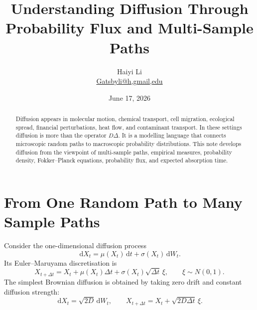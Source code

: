 \documentclass[11pt,a4paper]{article}
\title{\bfseries Understanding Diffusion Through Probability Flux and Multi-Sample Paths}
\author{Haiyi Li\\\href{mailto:Gatsbyli@h,gmail,edu}{Gatsbyli@h,gmail,edu}}
\date{June 17, 2026}
\numberwithin{equation}{section}
\newcommand{\dd}{\,\mathrm{d}}
\begin{document}
\maketitle

\begin{abstract}
Diffusion appears in molecular motion, chemical transport, cell migration, ecological spread, financial perturbations, heat flow, and contaminant transport. In these settings diffusion is more than the operator \(D\Delta\). It is a modelling language that connects microscopic random paths to macroscopic probability distributions. This note develops diffusion from the viewpoint of multi-sample paths, empirical measures, probability density, Fokker--Planck equations, probability flux, and expected absorption time.
\end{abstract}

\section{From One Random Path to Many Sample Paths}

Consider the one-dimensional diffusion process
\begin{equation}
  \dd X_t=\mu(X_t)\dd t+\sigma(X_t)\dd W_t .
  \label{eq:sde-general}
\end{equation}
Its Euler--Maruyama discretisation is
\begin{equation}
  X_{t+\Delta t}
  =X_t+\mu(X_t)\Delta t+\sigma(X_t)\sqrt{\Delta t}\,\xi,
  \qquad \xi\sim N(0,1).
  \label{eq:euler-maruyama}
\end{equation}
The simplest Brownian diffusion is obtained by taking zero drift and constant diffusion strength:
\begin{equation}
  \dd X_t=\sqrt{2D}\dd W_t,
  \qquad
  X_{t+\Delta t}=X_t+\sqrt{2D\Delta t}\,\xi .
  \label{eq:brownian-discrete}
\end{equation}
\end{document}
